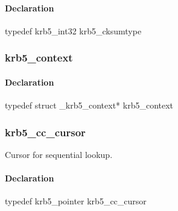 \documentclass[letterpaper,10pt,english]{sphinxmanual}
\begin{document}
\begin{fulllineitems}
\label{appdev/refs/types/krb5_cksumtype:c.krb5_cksumtype}
\end{fulllineitems}



\paragraph{Declaration}
\label{appdev/refs/types/krb5_cksumtype:declaration}
typedef krb5\_int32 krb5\_cksumtype


\subsubsection{krb5\_context}
\label{appdev/refs/types/krb5_context:krb5-context}\label{appdev/refs/types/krb5_context:krb5-context-struct}\label{appdev/refs/types/krb5_context::doc}

\begin{fulllineitems}
\label{appdev/refs/types/krb5_context:c.krb5_context}
\end{fulllineitems}



\paragraph{Declaration}
\label{appdev/refs/types/krb5_context:declaration}
typedef struct \_krb5\_context* krb5\_context


\subsubsection{krb5\_cc\_cursor}
\label{appdev/refs/types/krb5_cc_cursor:krb5-cc-cursor-struct}\label{appdev/refs/types/krb5_cc_cursor:krb5-cc-cursor}\label{appdev/refs/types/krb5_cc_cursor::doc}

\begin{fulllineitems}
\label{appdev/refs/types/krb5_cc_cursor:c.krb5_cc_cursor}
\end{fulllineitems}


Cursor for sequential lookup.


\paragraph{Declaration}
\label{appdev/refs/types/krb5_cc_cursor:declaration}
typedef krb5\_pointer krb5\_cc\_cursor
\end{document}
